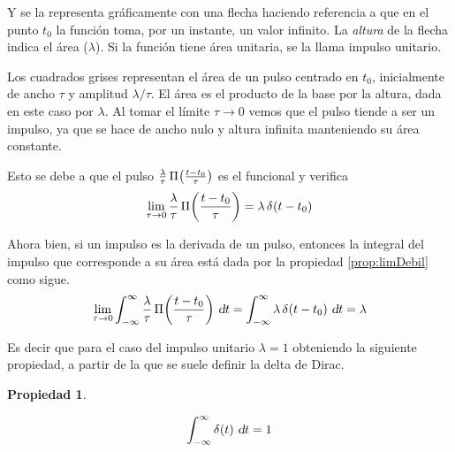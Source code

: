 \documentclass[a5paper,12pt,twoside]{book}
\newtheorem{prop}{{Propiedad}}[chapter]
\begin{document}
Y se la representa gráficamente con una flecha haciendo referencia a que en el punto $t_0$ la función toma, por un instante, un valor infinito. La \emph{altura} de la flecha indica el área ($\lambda$). Si la función tiene área unitaria, se la llama impulso unitario.

\begin{center}
    \def\svgwidth{0.6\linewidth}
    
\end{center}

Los cuadrados grises representan el área de un pulso centrado en $t_0$, inicialmente de ancho $\tau$ y amplitud $\lambda / \tau$. El área es el producto de la base por la altura, dada en este caso por $\lambda$. Al tomar el límite $\tau \to 0$ vemos que el pulso tiende a ser un impulso, ya que se hace de ancho nulo y altura infinita manteniendo su área constante.

Esto se debe a que el pulso $\frac{\lambda}{\tau} \, \fx[\Pi]{\frac{t-t_0}{\tau}}$ es el funcional y verifica
\begin{equation*}
    \lim_{\tau \to 0} \frac{\lambda}{\tau} \, \fx[\Pi]{\frac{t-t_0}{\tau}} = \lambda \, \fx[\delta]{t-t_0}
\end{equation*}

Ahora bien, si un impulso es la derivada de un pulso, entonces la integral del impulso que corresponde a su área está dada por la propiedad \ref{prop:limDebil} como sigue.
\begin{equation*}
    \lim_{\tau \to 0} \int_{-\infty}^\infty \frac{\lambda}{\tau} \, \fx[\Pi]{\frac{t-t_0}{\tau}} \, \dif t
    = \int_{-\infty}^\infty \lambda \, \fx[\delta]{t-t_0} \, \dif t
    = \lambda
\end{equation*}

Es decir que para el caso del impulso unitario $\lambda = 1$ obteniendo la siguiente propiedad, a partir de la que se suele definir la delta de Dirac.

\begin{mdframed}[style=MyFrame1]
    \begin{prop}
    \end{prop}
    \begin{equation*}
        \int_{-\infty}^\infty \fx[\delta]{t} \, \dif t = 1
    \end{equation*}
\end{mdframed}
\end{document}
